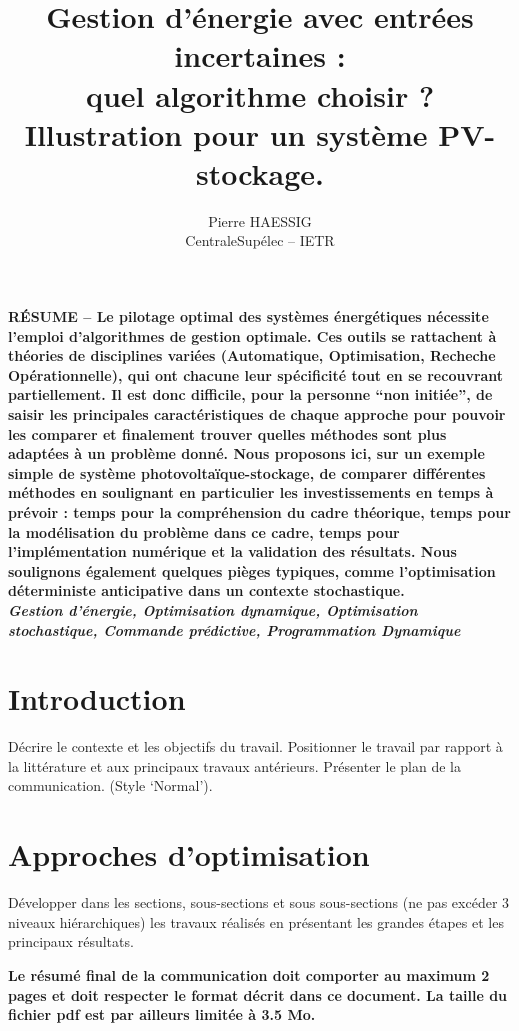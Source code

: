 \documentclass[a4paper,10pt,twocolumn]{article}
\title{
\fontsize{24pt}{24pt}\selectfont
Gestion d'énergie avec entrées incertaines : \\
quel algorithme choisir ?\\
Illustration pour un système PV-stockage.
}
\author{
\fontsize{11pt}{11pt}\selectfont
Pierre HAESSIG\tsp{*}\\
\fontsize{10pt}{10pt}\selectfont
\tsp{*}CentraleSupélec -- IETR
}
\date{}
\begin{document}
\maketitle
\thispagestyle{fancy}


\fontsize{9pt}{9pt}\selectfont
\textbf{RÉSUME --
Le pilotage optimal des systèmes énergétiques nécessite l'emploi d'algorithmes
de gestion optimale.
Ces outils se rattachent à théories de disciplines variées (Automatique, Optimisation, Recheche Opérationnelle),
qui ont chacune leur spécificité tout en se recouvrant partiellement.
%
Il est donc difficile, pour la personne ``non initiée'', de saisir les principales caractéristiques
de chaque approche pour pouvoir les comparer et finalement trouver
quelles méthodes sont plus adaptées à un problème donné.
%
Nous proposons ici, sur un exemple simple de système photovoltaïque-stockage, de
comparer différentes méthodes en soulignant en particulier les investissements
en temps à prévoir :
temps pour la compréhension du cadre théorique,
temps pour la modélisation du problème dans ce cadre,
temps pour l'implémentation numérique et la validation des résultats.
Nous soulignons également quelques pièges typiques, comme l'optimisation
déterministe anticipative dans un contexte stochastique.
}\\

\textbf{\textit{Gestion d'énergie, Optimisation dynamique, Optimisation stochastique,
Commande prédictive, Programmation Dynamique}}

\fontsize{10pt}{10pt}\selectfont


\section{Introduction}

Décrire le contexte et les objectifs du travail. Positionner le travail par rapport à la littérature et aux principaux travaux antérieurs. Présenter le plan de la communication. (Style ‘Normal’).
\cite{Haessig:2014:PhD}


\section{Approches d'optimisation}

Développer dans les sections, sous-sections et sous sous-sections (ne pas excéder 3 niveaux hiérarchiques) les travaux réalisés en présentant les grandes étapes et les principaux résultats.

\textbf{Le résumé final de la communication doit comporter au maximum 2 pages et doit respecter le format décrit dans ce document. La taille du fichier pdf est par ailleurs limitée à 3.5 Mo.}
\end{document}
